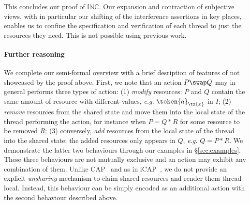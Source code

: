 This concludes our \colosl proof of $\mathbb{INC}$. Our expansion and
contraction  of  subjective
views, with in particular  our shifting of the interference assertions
in key places, 
enables us to confine the specification and verification of each
thread to just the resources they need. This  is not possible
using previous work.

\paragraph{Further \colosl reasoning}
We complete our semi-formal overview with a brief desription of features of \colosl not
showcased by the proof above. First, we note that an action $P\swap Q$
may in general performs three types of action: (1)
  \emph{modify} resources: $P$ and $Q$ contain the same amount of
  resource with different values, \textit{e.g.}
  $\token{a}_{\tx{x}}$ in $I$;
  (2)
  \emph{remove} resources from the shared state and move them into
  the local state of the thread performing the action, for instance
  when $P = Q * R$ for some resource to be removed $R$;
  (3)
  conversely, \emph{add} resources from the local state of the thread
  into the shared state; the added resources only appears in $Q$,
  \textit{e.g.} $Q = P * R$.
We demonstrate the latter two behaviours through our examples in
\S\ref{sec:examples}. These three behaviours are not mutually
exclusive and an action may exhibit any combination of them.  Unlike
CAP~\cite{cap-ecoop10} and as in iCAP~\cite{icap}, we do not provide
an explicit \emph{unsharing} mechanism to claim shared
resources and render them thread-local. Instead, this behaviour can
be simply encoded as an additional action with the second behaviour
described above.
%

